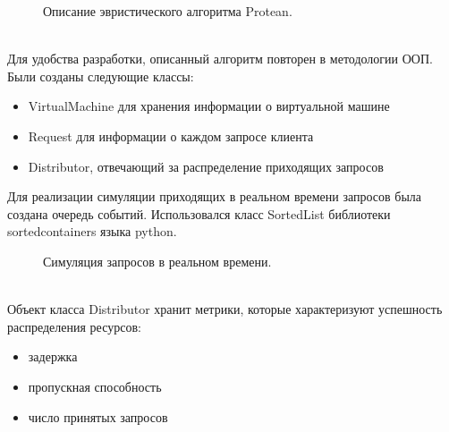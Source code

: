 \documentclass[draft]{article}
\begin{document}
\begin{figure}[h]
\caption{Описание эвристического алгоритма Protean\cite{litlink21}.}
\label{ris:image}
\end{figure}\\
Для удобства разработки, описанный алгоритм повторен в методологии ООП. Были созданы следующие классы: 
\begin{itemize}
\item VirtualMachine для хранения информации о виртуальной машине
\item Request для информации о каждом запросе клиента
\item Distributor, отвечающий за распределение приходящих запросов
\end{itemize}
Для реализации симуляции приходящих в реальном времени запросов была создана очередь событий. Использовался класс SortedList библиотеки sortedcontainers языка python. 
\begin{figure}[h!]
\caption{Симуляция запросов в реальном времени.}
\label{ris:image}
\end{figure}\\
Объект класса Distributor хранит метрики, которые характеризуют успешность распределения ресурсов:
\begin{itemize}
\item задержка
\item пропускная способность
\item число принятых запросов 
\end{itemize}
\end{document}
